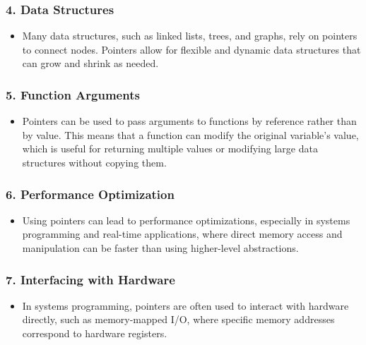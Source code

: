 \begin{botresponse}
\subsubsection{4. \textbf{Data Structures}}

\begin{itemize}
\item Many data structures, such as linked lists, trees, and graphs, rely on pointers to connect nodes. Pointers allow for flexible and dynamic data structures that can grow and shrink as needed.
\end{itemize}

\subsubsection{5. \textbf{Function Arguments}}

\begin{itemize}
\item Pointers can be used to pass arguments to functions by reference rather than by value. This means that a function can modify the original variable's value, which is useful for returning multiple values or modifying large data structures without copying them.
\end{itemize}

\subsubsection{6. \textbf{Performance Optimization}}

\begin{itemize}
\item Using pointers can lead to performance optimizations, especially in systems programming and real-time applications, where direct memory access and manipulation can be faster than using higher-level abstractions.
\end{itemize}

\subsubsection{7. \textbf{Interfacing with Hardware}}

\begin{itemize}
\item In systems programming, pointers are often used to interact with hardware directly, such as memory-mapped I/O, where specific memory addresses correspond to hardware registers.
\end{itemize}


\end{botresponse}
